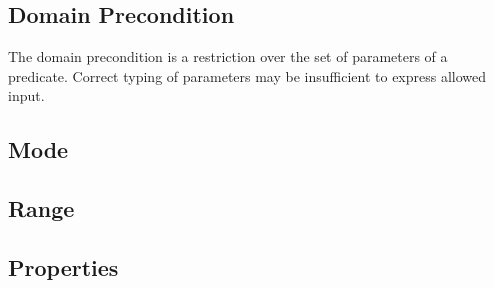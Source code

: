\subsection{Domain Precondition}

The domain precondition is a restriction over the set of parameters of a
predicate.
%
Correct typing of parameters may be insufficient to express allowed
input.
\subsection{Mode}
\subsection{Range}
\subsection{Properties}

